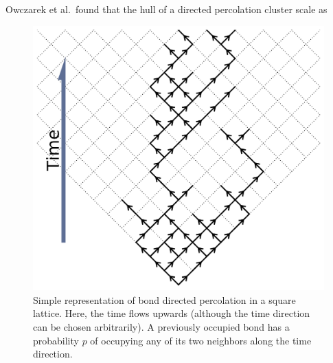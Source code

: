 Owczarek et al.\ found that the hull of a directed percolation cluster
scale as


\begin{figure}
\begin{center}
    \includegraphics[scale=0.5]{chapters/ch5-anis/figs/dperco_scheme}
\end{center}
\caption{Simple representation of bond directed percolation in a square
    lattice. Here, the time flows upwards (although the time direction can be
    chosen arbitrarily). A previously occupied bond has a probability $p$ of
    occupying any of its two neighbors along the time direction.}
\label{fig:dperco_scheme}
\end{figure}

